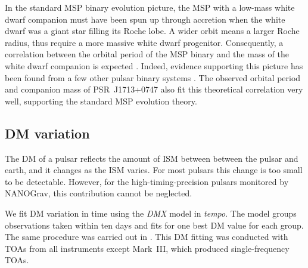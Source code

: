 In the standard MSP binary evolution picture, the MSP with a low-mass white dwarf companion must have been spun up through
accretion when the white dwarf was a giant star filling its Roche lobe. A wider
orbit means a larger Roche radius, thus require a more massive white dwarf 
progenitor.
Consequently, a correlation between the orbital period
of the MSP binary and the mass of the white dwarf companion is expected \citep{rpj+95, ts99a, prp02b, th14}. 
Indeed, evidence supporting this picture has been found from a few other pulsar
binary systems \citep[e.g.,][]{vbb+01, ktr94}.  
The observed  orbital period and companion mass of PSR~J1713+0747 also fit this theoretical correlation very well, supporting the standard MSP evolution theory. %




\subsection{DM variation}
\label{sec:dmx}
The DM of a pulsar reflects the amount of ISM between
between the pulsar and earth, and it changes as the ISM varies. For most pulsars
this change is too small to be detectable. However, for the
high-timing-precision pulsars monitored by NANOGrav, this contribution cannot be 
neglected.

We fit DM variation in time using the {\it DMX} model in {\it tempo}.
The model groups observations taken within ten days and fits for one
best DM value for each group.  The same procedure was carried out in
\citealt{dfg+13}.  This DM fitting was conducted with TOAs from all
instruments except Mark~III, which produced single-frequency TOAs.

